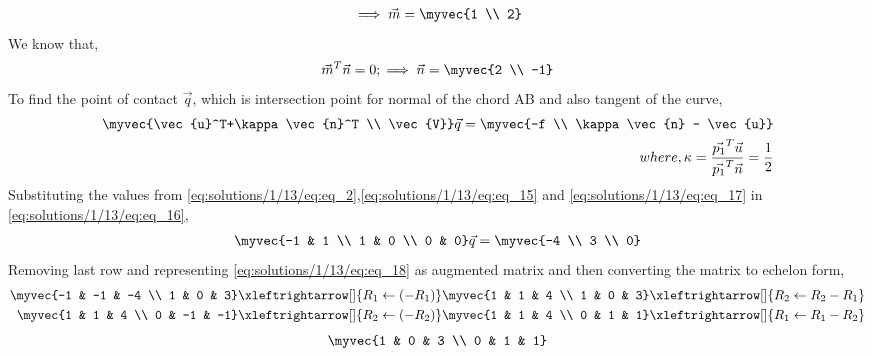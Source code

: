 \begin{align}
    \implies \vec{m} = \myvec{1 \\ 2} \label{eq:solutions/1/13/eq:eq_14}
\end{align}
We know that,
\begin{align} \label{eq:solutions/1/13/eq:eq_15}
    \vec{m}^T\vec{n} = 0; \implies \vec{n} = \myvec{2 \\ -1} 
\end{align}
To find the point of contact $\vec{q}$, which is intersection point for normal of the chord AB and also tangent of the curve,
\begin{align}
    \myvec{\vec{u}^T+\kappa\vec{n}^T \\ \vec{V}}\vec{q}=\myvec{-f \\ \kappa\vec{n} - \vec{u}} \label{eq:solutions/1/13/eq:eq_16} \\
    where, \kappa = \frac{\vec{p_1}^T\vec{u}}{\vec{p_1}^T\vec{n}} = \frac{1}{2} \label{eq:solutions/1/13/eq:eq_17}
\end{align}
Substituting the values from \eqref{eq:solutions/1/13/eq:eq_2},\eqref{eq:solutions/1/13/eq:eq_15} and \eqref{eq:solutions/1/13/eq:eq_17} in \eqref{eq:solutions/1/13/eq:eq_16},
\begin{align}
    \myvec{-1 & 1 \\ 1 & 0 \\ 0 & 0}\vec{q} = \myvec{-4 \\ 3 \\ 0} \label{eq:solutions/1/13/eq:eq_18}
\end{align}
Removing last row and representing \eqref{eq:solutions/1/13/eq:eq_18} as augmented matrix and then converting the matrix to echelon form,
\begin{align}
    \myvec{-1 & -1 & -4 \\ 1 & 0 & 3} \xleftrightarrow[]{R_1\leftarrow(-R_1)} \myvec{1 & 1 & 4 \\ 1 & 0 & 3} \xleftrightarrow[]{R_2\leftarrow R_2-R_1} \nonumber \\
    \myvec{1 & 1 & 4 \\ 0 & -1 & -1} \xleftrightarrow[]{R_2\leftarrow(-R_2)} \myvec{1 & 1 & 4 \\ 0 & 1 & 1} \xleftrightarrow[]{R_1\leftarrow R_1-R_2} \nonumber 
\end{align}
\begin{align}
    \myvec{1 & 0 & 3 \\ 0 & 1 & 1} \label{eq:solutions/1/13/eq:eq_19}
\end{align}
